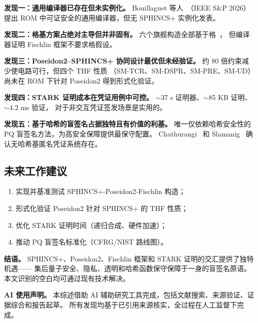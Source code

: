 \documentclass[11pt,a4paper]{ctexart}
\begin{document}
\medskip
\noindent\textbf{发现一：通用编译器已存在但未实例化。}
Bouillaguet 等人~\cite{Bouillaguet2026BlindingPH}（IEEE S\&P 2026）
提出 ROM 中可证安全的通用编译器，但无 SPHINCS+ 实例化发表。

\medskip
\noindent\textbf{发现二：格基方案占绝对主导但并非固有。}
六个旗舰构造全部基于格~\cite{delPino2022Framework,Beullens2023LatticeBlind,Agrawal2022Practical,Katsumata2021,Kastner2024PairingFree,Fuchsbauer2015Practical}，
但编译器证明 Fischlin 框架不要求格假设。

\medskip
\noindent\textbf{发现三：Poseidon2--SPHINCS+ 协同设计最优但未经验证。}
约 80 倍约束减少使电路可行，但四个 THF 性质
（SM-TCR、SM-DSPR、SM-PRE、SM-UD）
尚未在 ROM 下针对 Poseidon2 得到形式化验证。

\medskip
\noindent\textbf{发现四：STARK 证明成本在凭证用例中可控。}
$\sim$37 s 证明器、$\sim$85 KB 证明、$\sim$4.2 ms 验证，
对于非交互凭证签发场景是实用的。

\medskip
\noindent\textbf{发现五：基于哈希的盲签名占据独特且有价值的利基。}
唯一仅依赖哈希安全性的 PQ 盲签名方法，为高安全保障提供最保守配置。
Chathurangi~\cite{Chathurangi2025Advances} 和 Slamanig~\cite{Slamanig2025PrivacyAuth}
确认无哈希基匿名凭证系统存在。

\subsection{未来工作建议}

\begin{enumerate}
\item 实现并基准测试 SPHINCS+-Poseidon2-Fischlin 构造；
\item 形式化验证 Poseidon2 针对 SPHINCS+ 的 THF 性质；
\item 优化 STARK 证明时间（递归合成、硬件加速）；
\item 推动 PQ 盲签名标准化（CFRG/NIST 路线图）。
\end{enumerate}

\textbf{结语。}
SPHINCS+、Poseidon2、Fischlin 框架和 STARK 证明的交汇提供了独特机遇——
集后量子安全、隐私、透明和哈希函数保守保障于一身的盲签名原语。
本文识别的空白均可通过现有技术解决。

\medskip
\noindent\textbf{AI 使用声明。}
本综述借助 AI 辅助研究工具完成，包括文献搜索、来源验证、证据综合和报告起草。
所有发现均基于已引用来源核实，全过程在人工监督下完成。

\printbibliography[title={参考文献}]
\end{document}
